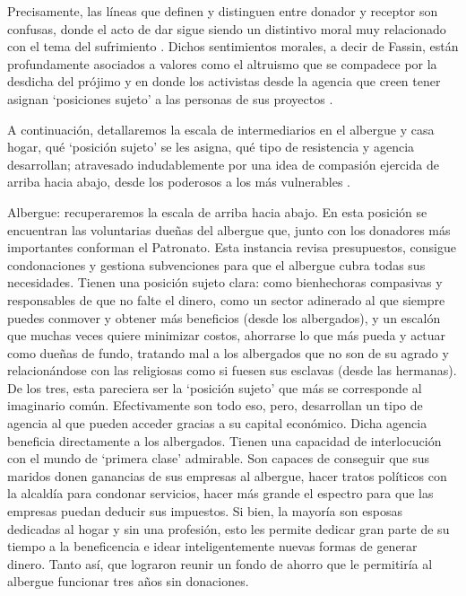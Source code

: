 \documentclass[
  spanish,
  11pt,
  a4paper,
]{scrbook}
\begin{document}
Precisamente, las líneas que definen y distinguen entre donador y
receptor son confusas, donde el acto de dar sigue siendo un distintivo
moral muy relacionado con el tema del sufrimiento
\autocite[9]{Redfield2011}. Dichos sentimientos morales, a decir de
Fassin, están profundamente asociados a valores como el altruismo que se
compadece por la desdicha del prójimo y en donde los activistas desde la
agencia que creen tener asignan `posiciones sujeto' a las personas de
sus proyectos \autocite[300]{PodgornikJakil2021}.

A continuación, detallaremos la escala de intermediarios en el albergue
y casa hogar, qué `posición sujeto' se les asigna, qué tipo de
resistencia y agencia desarrollan; atravesado indudablemente por una
idea de compasión ejercida de arriba hacia abajo, desde los poderosos a
los más vulnerables \autocite[14]{Fassin2016}.

Albergue: recuperaremos la escala de arriba hacia abajo. En esta
posición se encuentran las voluntarias dueñas del albergue que, junto
con los donadores más importantes conforman el Patronato. Esta instancia
revisa presupuestos, consigue condonaciones y gestiona subvenciones para
que el albergue cubra todas sus necesidades. Tienen una posición sujeto
clara: como bienhechoras compasivas y responsables de que no falte el
dinero, como un sector adinerado al que siempre puedes conmover y
obtener más beneficios (desde los albergados), y un escalón que muchas
veces quiere minimizar costos, ahorrarse lo que más pueda y actuar como
dueñas de fundo, tratando mal a los albergados que no son de su agrado y
relacionándose con las religiosas como si fuesen sus esclavas (desde las
hermanas). De los tres, esta pareciera ser la `posición sujeto' que más
se corresponde al imaginario común. Efectivamente son todo eso, pero,
desarrollan un tipo de agencia al que pueden acceder gracias a su
capital económico. Dicha agencia beneficia directamente a los
albergados. Tienen una capacidad de interlocución con el mundo de
`primera clase' admirable. Son capaces de conseguir que sus maridos
donen ganancias de sus empresas al albergue, hacer tratos políticos con
la alcaldía para condonar servicios, hacer más grande el espectro para
que las empresas puedan deducir sus impuestos. Si bien, la mayoría son
esposas dedicadas al hogar y sin una profesión, esto les permite dedicar
gran parte de su tiempo a la beneficencia e idear inteligentemente
nuevas formas de generar dinero. Tanto así, que lograron reunir un fondo
de ahorro que le permitiría al albergue funcionar tres años sin
donaciones.
\end{document}
